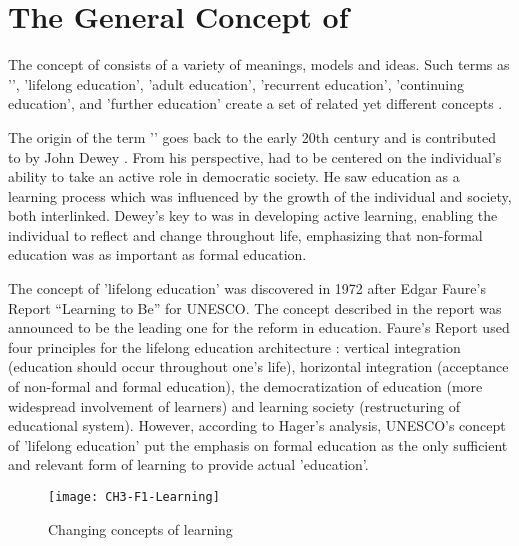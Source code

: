 \section{The General Concept of \LLLc}
The concept of \LLLs consists of a variety of meanings, models and ideas. Such
terms as '\LLLsn', 'lifelong education', 'adult education', 'recurrent
education', 'continuing education', and 'further education' create a set of
related yet different concepts \citep{Hager2011,Jarvis2004}.

The origin of the term '\LLLsn' goes back to the early 20th century and is
contributed to by John Dewey \citeyearpar{Dewey2004}. From his perspective,
\LLLs had to be centered on the individual's ability to take an active role in
democratic society. He saw education as a learning process which was influenced
by the growth of the individual and society, both interlinked. Dewey's key to
\LLLs was in developing active learning, enabling the individual to reflect and
change throughout life, emphasizing that non-formal education was as important
as formal education.

The concept of 'lifelong education' was discovered in 1972 after Edgar Faure's
Report ``Learning to Be'' for UNESCO. The concept described in the report was announced
to be the leading one for the reform in education. Faure's Report used four
principles for the lifelong education architecture \citep{Faure1972}: vertical
integration (education should occur throughout one's life), horizontal
integration (acceptance of non-formal and formal education), the democratization
of education (more widespread involvement of learners) and learning society
(restructuring of educational system). However, according to Hager's
\citeyearpar{Hager2011} analysis, UNESCO's concept of 'lifelong education' put
the emphasis on formal education as the only sufficient and relevant form of
learning to provide actual 'education'.

\begin{figure}[htb]
\centering
\texttt{[image: CH3-F1-Learning]}
\caption[Changing concepts of learning]{Changing concepts of learning 
\citep{Jarvis2004}}
\label{fig:learning}
\end{figure}

